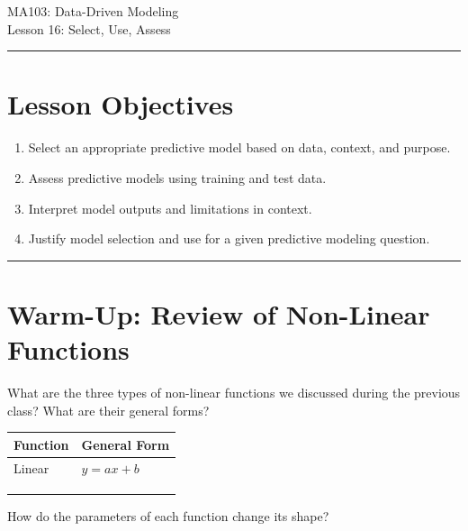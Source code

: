 \documentclass[11pt]{article}
\begin{document}
\begin{center} \Large {MA103: Data-Driven Modeling\\Lesson 16: Select, Use, Assess}  \end{center}
\hrule

\vspace{-0.25in}
\section*{Lesson Objectives}
\vspace{-0.2in}
\begin{enumerate}
\item Select an appropriate predictive model based on data, context, and purpose.
\item Assess predictive models using training and test data.
\item Interpret model outputs and limitations in context.
\item Justify model selection and use for a given predictive modeling question.
\end{enumerate}

\hrule

\vspace{-0.3in}
\noindent
\section*{Warm-Up: Review of Non-Linear Functions}
\vspace{-0.2in}
What are the three types of non-linear functions we discussed during the previous class? What are their general forms?

\begin{table}[h]
    \centering
    \begin{tabular}{|p{}|p{}|}
        \hline
        \textbf{Function} & \textbf{General Form} \\
        \hline
        Linear & $y = ax + b$ \\
        \hline
         & \\
        \hline
         & \\
        \hline
         & \\
        \hline
    \end{tabular}
\end{table}

\noindent How do the parameters of each function change its shape?

\vfill
\end{document}

